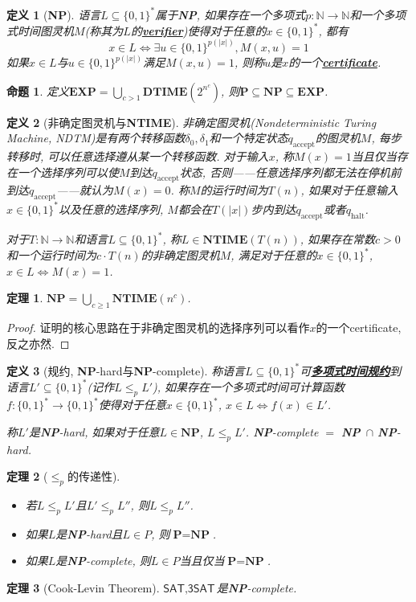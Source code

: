 \documentclass[8pt]{article}
\theoremstyle{compact}
\newtheorem{theorem}{定理}
\newtheorem{definition}{定义}
\newtheorem{proposition}{命题}
\def\obj#1{\textbf{\uline{#1}}}
\def\le{\leqslant}
\def\ge{\geqslant}
\def\DTIME{\textbf{DTIME}}
\def\NTIME{\textbf{NTIME}}
\def\P{\textbf{P}}
\def\NP{\textbf{NP}}
\def\EXP{\textbf{EXP}}
\begin{document}
\begin{definition}[\NP]
	语言$L \subseteq \{0, 1\}^*$属于\NP, 如果存在一个多项式$p: \mathbb N \to \mathbb N$和一个多项式时间图灵机$M$(称其为$L$的\obj{verifier})使得对于任意的$x \in \{0, 1\}^*$, 都有
	$$x \in L \Leftrightarrow \exists u \in \{0, 1\}^{p(|x|)}, M(x, u) = 1$$
	如果$x \in L$与$u \in \{0, 1\}^{p(|x|)}$满足$M(x, u) = 1$, 则称$u$是$x$的一个\obj{certificate}. 
\end{definition}
\begin{proposition}
	定义$\EXP = \bigcup_{c > 1} \DTIME(2^{n^c})$, 则$\P \subseteq \NP \subseteq \EXP$. 
\end{proposition}
\begin{definition}[非确定图灵机与\NTIME]
	非确定图灵机(Nondeterministic Turing Machine, NDTM)是有两个转移函数$\delta_0, \delta_1$和一个特定状态$q_{\text{accept}}$的图灵机$M$, 每步转移时, 可以任意选择遵从某一个转移函数. 对于输入$x$, 称$M(x) = 1$当且仅当存在一个选择序列可以使$M$到达$q_{\text{accept}}$状态, 否则——任意选择序列都无法在停机前到达$q_{\text{accept}}$——就认为$M(x) = 0$. 称$M$的运行时间为$T(n)$, 如果对于任意输入$x \in \{0, 1\}^*$以及任意的选择序列, $M$都会在$T(|x|)$步内到达$q_{\text{accept}}$或者$q_{\text{halt}}$. 

	对于$T: \mathbb N \to \mathbb N$和语言$L \subseteq \{0, 1\}^*$, 称$L \in \NTIME(T(n))$, 如果存在常数$c > 0$和一个运行时间为$c \cdot T(n)$的非确定图灵机$M$, 满足对于任意的$x \in \{0, 1\}^*$, $x \in L \Leftrightarrow M(x) = 1$. 
\end{definition}
\begin{theorem}
	$\NP = \bigcup_{c \ge 1} \NTIME(n^c)$. 
\end{theorem}
\begin{proof}
	证明的核心思路在于非确定图灵机的选择序列可以看作$x$的一个certificate, 反之亦然. 
\end{proof}

\begin{definition}[规约, \NP-hard与\NP-complete]
	称语言$L \subseteq \{0, 1\}^*$可\obj{多项式时间规约}到语言$L' \subseteq \{0, 1\}^*$(记作$L \le_p L'$), 如果存在一个多项式时间可计算函数$f: \{0, 1\}^* \to \{0, 1\}^*$使得对于任意$x \in \{0, 1\}^*$, $x \in L \Leftrightarrow f(x) \in L'$. 

	称$L'$是\NP-hard, 如果对于任意$L \in \NP$, $L \le_p L'$. \NP-complete $=$ \NP\ $\cap$ \NP-hard.  
\end{definition}
\begin{theorem}[$\le_p$的传递性]
	\begin{itemize}
		\item 若$L \le_p L'$且$L' \le_p L''$, 则$L \le_p L''$. 
		\item 如果$L$是\NP-hard且$L \in P$, 则$\P = \NP$. 
		\item 如果$L$是\NP-complete, 则$L \in P$当且仅当$\P = \NP$. 
	\end{itemize}
\end{theorem}
\begin{theorem}[Cook-Levin Theorem]
	$\textsf{SAT}, \textsf{3SAT}$是\NP-complete. 
\end{theorem}
\end{document}
